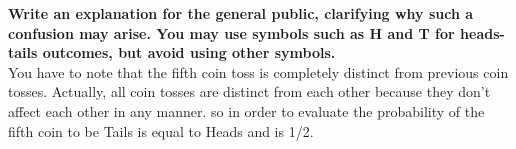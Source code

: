 \documentclass{article}
\begin{document}
	\textbf{Write an explanation for the general public,
		clarifying why such a confusion may arise. You may
		use symbols such as H and T for heads-tails
		outcomes, but avoid using other symbols.}\\
	
		You have to note that the fifth coin toss is completely distinct from previous coin tosses. Actually, all coin tosses are distinct from each other because they don't affect each other in any manner. so in order to evaluate the probability of the fifth coin to be Tails is equal to Heads and is 1/2.
\end{document}
